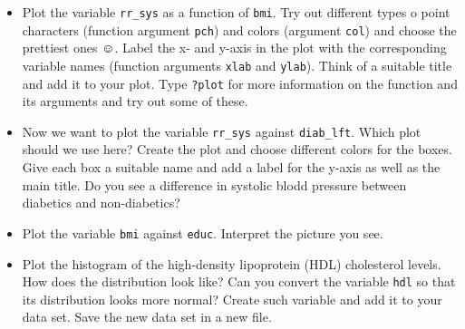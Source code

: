 \documentclass[]{article}
\begin{document}
\begin{itemize}
\itemsep1pt\parskip0pt
\item
  Plot the variable \texttt{rr\_sys} as a function of \texttt{bmi}. Try
  out different types o point characters (function argument
  \texttt{pch}) and colors (argument \texttt{col}) and choose the
  prettiest ones $\smiley$. Label the x- and y-axis in the plot with the
  corresponding variable names (function arguments \texttt{xlab} and
  \texttt{ylab}). Think of a suitable title and add it to your plot.
  Type \texttt{?plot} for more information on the function and its
  arguments and try out some of these.\\
\item
  Now we want to plot the variable \texttt{rr\_sys} against
  \texttt{diab\_lft}. Which plot should we use here? Create the plot and
  choose different colors for the boxes. Give each box a suitable name
  and add a label for the y-axis as well as the main title. Do you see a
  difference in systolic blodd pressure between diabetics and
  non-diabetics?\\
\item
  Plot the variable \texttt{bmi} against \texttt{educ}. Interpret the
  picture you see.\\
\item
  Plot the histogram of the high-density lipoprotein (HDL) cholesterol
  levels. How does the distribution look like? Can you convert the
  variable \texttt{hdl} so that its distribution looks more normal?
  Create such variable and add it to your data set. Save the new data
  set in a new file.
\end{itemize}
\end{document}
